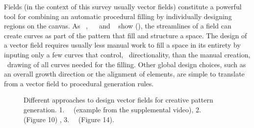 Fields (in the context of this survey usually vector fields) constitute a powerful tool for combining an automatic procedural filling by individually designing regions on the canvas. As \citeauthor*{hsu_2020_aef}~\cite{hsu_2020_aef}, ~\citeauthor*{saputra_2017_ffo}~\cite{saputra_2017_ffo} and \citeauthor*{gieseke_2017_ooo}~\cite{gieseke_2017_ooo} show (), the streamlines of a field can create curves as part of the pattern that fill and structure a space. The design of a vector field requires usually less manual work to fill a space in its entirety by inputing only a few curves that control, \eg~directionality, than the manual creation, \eg~drawing of all curves needed for the filling. Other global design choices, such as an overall growth direction or the alignment of elements, are simple to translate from a vector field to procedural generation rules.

\begin{figure}[H]
    \centering
    \caption{\label{fig:fields}Different approaches to design vector fields for creative pattern generation. 1.~\citeauthor*{gieseke_2017_ooo}~\cite{gieseke_2017_ooo} (example from the supplemental video), 2.~\citeauthor*{hsu_2020_aef}~\cite{hsu_2020_aef} (Figure 10) \color{orange}{Status rights: invoice received}\color{black}, 3.~\citeauthor*{saputra_2017_ffo}~\cite{saputra_2017_ffo} (Figure 14).}
\end{figure}

